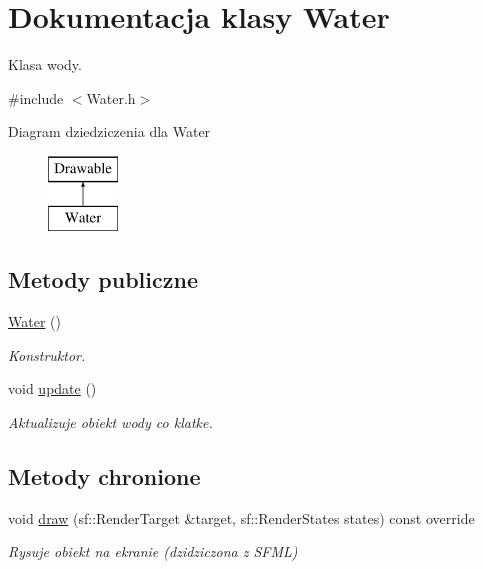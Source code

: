 \hypertarget{class_water}{}\section{Dokumentacja klasy Water}
\label{class_water}


Klasa wody.  




{\ttfamily \#include $<$Water.\+h$>$}

Diagram dziedziczenia dla Water\begin{figure}[H]
\begin{center}
\leavevmode
\includegraphics[height=2.000000cm]{class_water}
\end{center}
\end{figure}
\subsection*{Metody publiczne}
\begin{DoxyCompactItemize}
\item 
\mbox{\hyperlink{class_water_a32d8f391b149a405008a606ceafa35ee}{Water}} ()
\begin{DoxyCompactList}\small\item\em Konstruktor. \end{DoxyCompactList}\item 
void \mbox{\hyperlink{class_water_a18fce2c0b2c45ee4ea8e413fcb4bdafa}{update}} ()
\begin{DoxyCompactList}\small\item\em Aktualizuje obiekt wody co klatke. \end{DoxyCompactList}\end{DoxyCompactItemize}
\subsection*{Metody chronione}
\begin{DoxyCompactItemize}
\item 
void \mbox{\hyperlink{class_water_a4a929b9c339c55d6c7bcabe79349bae8}{draw}} (sf\+::\+Render\+Target \&target, sf\+::\+Render\+States states) const override
\begin{DoxyCompactList}\small\item\em Rysuje obiekt na ekranie (dzidziczona z S\+F\+ML) \end{DoxyCompactList}\end{DoxyCompactItemize}


